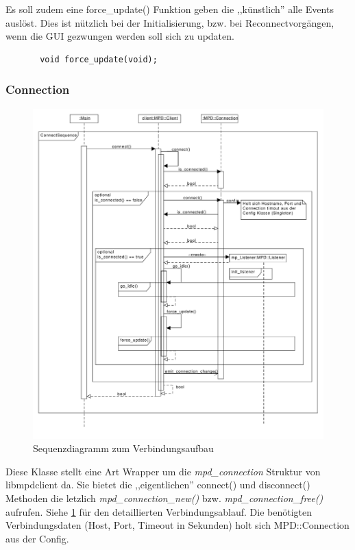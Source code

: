 Es soll zudem eine force\_update() Funktion geben die ,,künstlich'' alle Events auslöst.
Dies ist nützlich bei der Initialisierung, bzw. bei Reconnectvorgängen, wenn die GUI gezwungen werden
soll sich zu updaten.
\begin{verbatim}
       void force_update(void);
\end{verbatim}

\subsubsection{Connection}
\begin{figure}[htb!]
	\centering
        \includegraphics[scale=0.5]{ConnectSequence.pdf}
	\caption{Sequenzdiagramm zum Verbindungsaufbau}
	\label{seq_client_connect}
\end{figure}
Diese Klasse stellt eine Art Wrapper um die \textit{mpd\_connection} Struktur von libmpdclient da.
Sie bietet die ,,eigentlichen'' connect() und disconnect() Methoden die letzlich \textit{mpd\_connection\_new()} bzw. \textit{mpd\_connection\_free()} aufrufen. Siehe \ref{seq_client_connect} für den detaillierten Verbindungsablauf. Die benötigten Verbindungsdaten (Host, Port, Timeout in Sekunden) holt sich MPD::Connection aus der Config.
